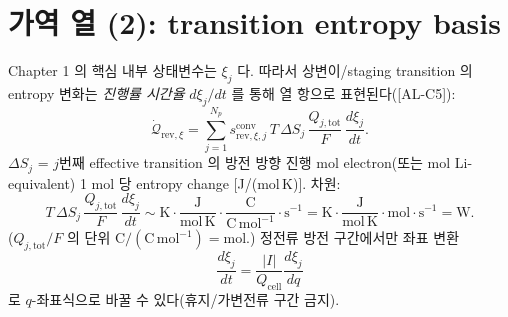 \documentclass[11pt,a4paper]{article}
\newcommand{\tot}{\mathrm{tot}}
\newcommand{\cell}{\mathrm{cell}}
\newcommand{\rev}{\mathrm{rev}}
\newcommand{\conv}{\mathrm{conv}}
\newcommand{\AL}[1]{\textsf{[AL-#1]}}
\begin{document}
\section{가역 열 (2): transition entropy basis}\label{sec:ch2_revxi}
Chapter 1 의 핵심 내부 상태변수는 $\xi_j$ 다. 따라서 상변이/staging transition 의 entropy 변화는
\emph{진행률 시간율} $d\xi_j/dt$ 를 통해 열 항으로 표현된다(\AL{C5}):
\begin{equation}
\dot{\mathcal Q}_{\rev,\xi}=\sum_{j=1}^{N_p}s_{\rev,\xi,j}^{\conv}\,T\,\Delta S_j\,\frac{Q_{j,\tot}}{F}\,\frac{d\xi_j}{dt}.
\label{eq:ch2_revxi}
\end{equation}
$\Delta S_j$ = $j$번째 effective transition 의 방전 방향 진행 mol electron(또는 mol Li-equivalent) 1 mol 당
entropy change [J/(mol\,K)]. 차원:
\begin{equation}
T\,\Delta S_j\,\frac{Q_{j,\tot}}{F}\,\frac{d\xi_j}{dt}\sim
\mathrm K\cdot\frac{\mathrm J}{\mathrm{mol\,K}}\cdot\frac{\mathrm C}{\mathrm{C\,mol^{-1}}}\cdot\mathrm s^{-1}
=\mathrm K\cdot\frac{\mathrm J}{\mathrm{mol\,K}}\cdot\mathrm{mol}\cdot\mathrm s^{-1}=\mathrm W.
\label{eq:ch2_revxi_dim}
\end{equation}
($Q_{j,\tot}/F$ 의 단위 $\mathrm C/(\mathrm{C\,mol^{-1}})=\mathrm{mol}$.) 정전류 방전 구간에서만 좌표 변환
\begin{equation}
\frac{d\xi_j}{dt}=\frac{|I|}{Q_\cell}\frac{d\xi_j}{dq}
\label{eq:ch2_revxi_q}
\end{equation}
로 $q$-좌표식으로 바꿀 수 있다(휴지/가변전류 구간 금지).
\end{document}
